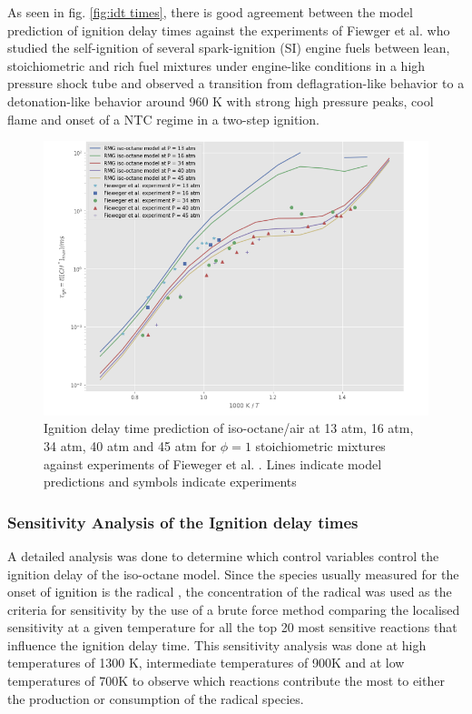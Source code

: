 As seen in fig. \ref{fig:idt times}, there is good agreement between the model prediction of ignition delay times against the experiments of Fiewger et al. who studied the self-ignition of several spark-ignition (SI) engine fuels between lean, stoichiometric and rich fuel mixtures under engine-like conditions in a high pressure shock tube and observed a transition from deflagration-like behavior to a  detonation-like behavior around 960 K with strong high pressure peaks, cool flame and onset of a NTC regime in a two-step ignition.


\begin{figure}[!hbp]
    \centering
    \includegraphics[scale=0.4, keepaspectratio]{images/ic8-idt.png}
    \caption{Ignition delay time prediction of iso-octane/air at 13 atm, 16 atm, 34 atm, 40 atm and 45 atm for $\phi=1$ stoichiometric mixtures against experiments of Fieweger et al. \cite{Fieweger1994Shock-tubePressures}\cite{Fieweger1997Self-ignitionPressure}. Lines indicate model predictions and symbols indicate experiments}
    \label{fig:ic8-idt}
\end{figure}

\cleardoublepage
\subsubsection{Sensitivity Analysis of the Ignition delay times}
A detailed analysis was done to determine which control variables control the ignition delay of the iso-octane model. Since the species usually measured for the onset of ignition is the  radical \cite{Ji2019EvolutionAutoignition}, the concentration of the  radical was used as the criteria for sensitivity by the use of a brute force method comparing the localised sensitivity at a given temperature for all the top 20 most sensitive reactions that influence the ignition delay time. This sensitivity analysis was done at high temperatures of 1300 K, intermediate temperatures of 900K and at low temperatures of 700K to observe which reactions contribute the most to either the production or consumption of the  radical species. 


